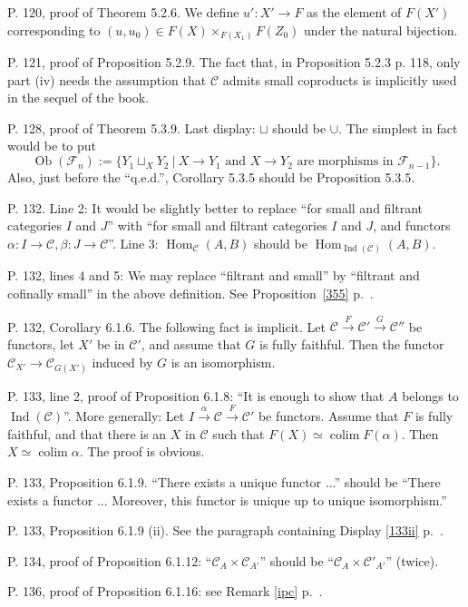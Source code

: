\documentclass[12pt]{article}
\theoremstyle{remark}%
\newcommand{\n}{\noindent}
\newcommand{\C}{\mathcal C}
\newcommand{\F}{\mathcal F}
\newcommand{\pr}{Proposition}
\DeclareMathOperator*{\coli}{colim}
\DeclareMathOperator{\Hom}{Hom}
\DeclareMathOperator{\Ind}{Ind}
\DeclareMathOperator{\Ob}{Ob}
\begin{document}
\n P. 120, proof of Theorem 5.2.6. We define $u':X'\to F$ as the element of $F(X')$ corresponding to $(u,u_0)\in F(X)\times_{F(X_1)}F(Z_0)$ under the natural bijection. 

\n P. 121, proof of Proposition 5.2.9. The fact that, in Proposition 5.2.3 p. 118, only part (iv) needs the assumption that $\C$ admits small coproducts is implicitly used in the sequel of the book. 

\n P. 128, proof of Theorem 5.3.9. Last display: $\sqcup$ should be $\cup$. The simplest in fact would be to put 
$$
\Ob(\F_n):=\{Y_1\sqcup_XY_2\ |\ X\to Y_1\text{ and }X\to Y_2\text{ are morphisms in }\F_{n-1}\}.
$$ 
Also, just before the ``q.e.d.'', Corollary 5.3.5 should be Proposition 5.3.5. 

\n P. 132. Line 2: It would be slightly better to replace ``for small and filtrant categories $I$ and $J$'' with ``for small and filtrant categories $I$ and $J$, and functors $\alpha:I\to\C,\beta:J\to\C$''. Line 3: $\Hom_\C(A,B)$ should be $\Hom_{\Ind(\C)}(A,B)$. 

\n P. 132, lines 4 and 5: \guillemotleft We may replace ``filtrant and small'' by ``filtrant and cofinally small'' in the above definition\guillemotright. See \pr\ \ref{355} p.~\pageref{355}. 

\n P. 132, Corollary 6.1.6. The following fact is implicit. Let $\C\xrightarrow{F}\C'\xrightarrow{G}\C''$ be functors, let $X'$ be in $\C'$, and assume that $G$ is fully faithful. Then the functor $\C_{X'}\to\C_{G(X')}$ induced by $G$ is an isomorphism. 

\n P. 133, line 2, proof of Proposition 6.1.8: ``It is enough to show that $A$ belongs to $\Ind(\C)$''. More generally: Let $I\xrightarrow{\alpha}\C\xrightarrow{F}\C'$ be functors. Assume that $F$ is fully faithful, and that there is an $X$ in $\C$ such that $F(X)\simeq\coli F(\alpha)$. Then $X\simeq\coli\alpha$. The proof is obvious. 

\n P. 133, Proposition 6.1.9. ``There exists a unique functor ...'' should be ``There exists a functor ... Moreover, this functor is unique up to unique isomorphism.'' 

\n P. 133, Proposition 6.1.9 (ii). See the paragraph containing Display \eqref{133ii} p.~\pageref{133ii}. 

\n P. 134, proof of Proposition 6.1.12: ``$\C_A\times\C_{A'}$'' should be ``$\C_A\times\C'_{A'}$'' (twice). 

\n P. 136, proof of Proposition 6.1.16: see Remark \ref{ipc} p.~\pageref{ipc}. 
\end{document}
